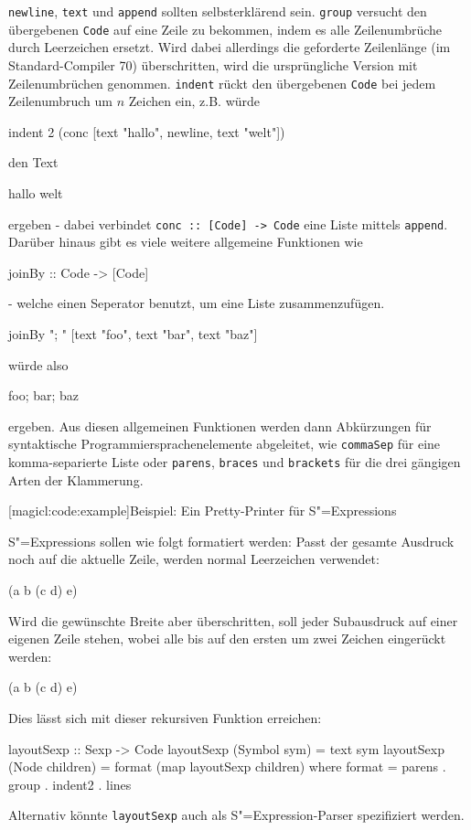 \documentclass[a4paper, bibgerm]{book}
\newcommand\icode[1]{\lstinline?#1?}
\newcommand\lsection{}
\newcommand{\sexp}{S"=Expression}
\newcommand{\sexps}{S"=Expressions}
\begin{document}
\icode{newline}, \icode{text} und \icode{append} sollten selbsterklärend
sein. \icode{group} versucht den übergebenen \icode{Code} auf eine Zeile
zu bekommen, indem es alle Zeilenumbrüche durch Leerzeichen
ersetzt. Wird dabei allerdings die geforderte Zeilenlänge (im
Standard-Compiler 70) überschritten, wird die ursprüngliche Version mit
Zeilenumbrüchen genommen. \icode{indent} rückt den übergebenen
\icode{Code} bei jedem Zeilenumbruch um $n$ Zeichen ein, z.B. würde
\begin{code}
indent 2 (conc [text "hallo", newline, text "welt"])
\end{code}
den Text
\begin{code}
hallo
  welt
\end{code}
ergeben - dabei verbindet \icode{conc :: [Code] -> Code} eine Liste
mittels \icode{append}. Darüber hinaus gibt es viele weitere allgemeine
Funktionen wie
\begin{code}
  joinBy :: Code -> [Code]
\end{code}
- welche einen Seperator benutzt, um eine Liste zusammenzufügen.
\begin{code}
joinBy "; " [text "foo", text "bar", text "baz"]
\end{code}
würde also
\begin{code}
foo; bar; baz
\end{code}
ergeben. Aus diesen allgemeinen Funktionen werden dann Abkürzungen für
syntaktische Programmiersprachenelemente abgeleitet, wie
\icode{commaSep} für eine komma-separierte Liste oder \icode{parens},
\icode{braces} und \icode{brackets} für die drei gängigen Arten der
Klammerung.

\lsection[magicl:code:example]{Beispiel: Ein Pretty-Printer für \sexps{}}

\sexps{} sollen wie folgt formatiert werden: Passt der gesamte Ausdruck
noch auf die aktuelle Zeile, werden normal Leerzeichen verwendet:
\begin{code}
(a b (c d) e)
\end{code}
Wird die gewünschte Breite aber überschritten, soll jeder Subausdruck
auf einer eigenen Zeile stehen, wobei alle bis auf den ersten um zwei
Zeichen eingerückt werden:
\begin{code}
(a
  b
  (c d)
  e)
\end{code}
Dies lässt sich mit dieser rekursiven Funktion erreichen:
\begin{code}
layoutSexp :: Sexp -> Code
layoutSexp (Symbol sym)    = text sym
layoutSexp (Node children) = format (map layoutSexp children)
  where format = parens . group . indent2 . lines
\end{code} %
Alternativ könnte \icode{layoutSexp} auch als \sexp{}-Parser
spezifiziert werden.
\end{document}
